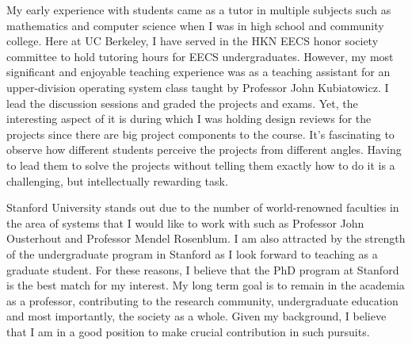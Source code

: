 \documentclass[11pt]{article}
\begin{document}
My early experience with students came as a tutor in multiple subjects such as mathematics and computer science when I was in high school and community college. Here at UC Berkeley, I have served in the HKN EECS honor society committee to hold tutoring hours for EECS undergraduates. However, my most significant and enjoyable teaching experience was as a teaching assistant for an upper-division operating system class taught by Professor John Kubiatowicz. I lead the discussion sessions and graded the projects and exams. Yet, the interesting aspect of it is during which I was holding design reviews for the projects since there are big project components to the course. It's fascinating to observe how different students perceive the projects from different angles. Having to lead them to solve the projects without telling them exactly how to do it is a challenging, but intellectually rewarding task. \newline
%

Stanford University stands out due to the number of world-renowned faculties in the area of systems that I would like to work with such as Professor John Ousterhout and Professor Mendel Rosenblum. I am also attracted by the strength of the undergraduate program in Stanford as I look forward to teaching as a graduate student. For these reasons, I believe that the PhD program at Stanford is the best match for my interest. My long term goal is to remain in the academia as a professor, contributing to the research community, undergraduate education and most importantly, the society as a whole. Given my background, I believe that I am in a good position to make crucial contribution in such pursuits. \newline



\end{document}
